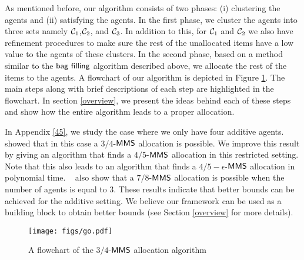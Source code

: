 As mentioned before, our algorithm consists of two phases: (i) clustering the agents and (ii) satisfying the agents. In the first phase, we cluster the agents into three sets namely $\mathcal{C}_1$,$\mathcal{C}_2$, and $\mathcal{C}_3$. In addition to this, for $\mathcal{C}_1$ and $\mathcal{C}_2$ we also have refinement procedures to make sure the rest of the unallocated items have a low value to the agents of these clusters. In the second phase, based on a method similar to the $\textsf{bag filling}$ algorithm described above, we allocate the rest of the items to the agents. A flowchart of our algorithm is depicted in Figure \ref{go}. The main steps along with brief descriptions of each step are highlighted in the flowchart. In section \ref{overview}, we present the ideas behind each of these steps and show how the entire algorithm leads to a proper allocation. 


In Appendix \ref{45}, we study the case where we only have four additive agents. \procacciafirst~\cite{Procaccia:first} showed that in this case a $3/4$-$\mathsf{MMS}$ allocation is possible. We improve this result by giving an algorithm that finds a $4/5$-$\mathsf{MMS}$ allocation in this restricted setting. Note that this also leads to an algorithm that finds a $4/5-\epsilon$-$\mathsf{MMS}$ allocation in polynomial time.  \amanatidisapproximation~\cite{amanatidis2015approximation} also show that a $7/8$-$\mathsf{MMS}$ allocation is possible when the number of agents is equal to 3. These results indicate that better bounds can be achieved for the additive setting. We believe our framework can be used as a building block to obtain better bounds (see Section \ref{overview} for more details).

\begin{figure}[!htbp]
\centerline{
\texttt{[image: figs/go.pdf]}
}
\caption{A flowchart of the $3/4$-$\mathsf{MMS}$ allocation algorithm}
\label{go}
\end{figure} 

